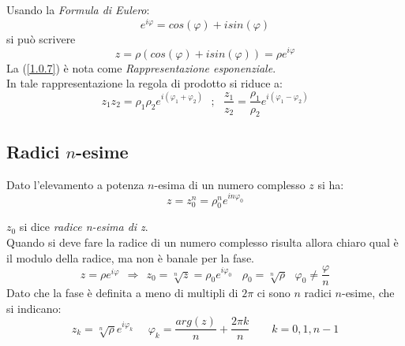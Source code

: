 \documentclass[twoside]{article}
\begin{document}
\\
\\
Usando la \textit{Formula di Eulero}:
\begin{equation}
    e^{i\varphi}=cos(\varphi)+isin(\varphi)
\end{equation}
si può scrivere 
\begin{equation} \label{1.0.7}
    z=\rho(cos(\varphi)+isin(\varphi))=\rho e^{i\varphi}
\end{equation}
La (\ref{1.0.7}) è nota come \textit{Rappresentazione esponenziale}.
\\
In tale rappresentazione la regola di prodotto si riduce a:
\begin{equation}
    z_1z_2=\rho_1 \rho_2 e^{i(\varphi_1 + \varphi_2)} \ \ \ ; \ \ \ \frac{z_1}{z_2}=\frac{\rho_1}{\rho_2}e^{i(\varphi_1 - \varphi_2)}
\end{equation}

\subsection{Radici \texorpdfstring{$n$}{Lg}-esime}
Dato l'elevamento a potenza $n$-esima di un numero complesso $z$ si ha:
\begin{equation}
    z=z_0 ^n=\rho_0 ^n e^{in\varphi_0}
\end{equation}

$z_0$ si dice \textit{radice n-esima di z}. \\
Quando si deve fare la radice di un numero complesso risulta allora chiaro qual è il modulo della radice, ma non è banale per la fase.
\begin{equation}
    z=\rho e^{i\varphi} \ \ \Rightarrow \ \ z_0=\sqrt[n]{z}=\rho_0 e^{i\varphi_0} \ \ \ \ \rho_0=\sqrt[n]{\rho} \ \ \ \varphi_0 \ne \frac{\varphi}{n}
\end{equation}
Dato che la fase è definita a meno di multipli di $2\pi$ ci sono $n$ radici $n$-esime, che si indicano:
\begin{equation}
    z_k=\sqrt[n]{\rho}e^{i\varphi_k} \ \ \ \ \ \ \varphi_k=\frac{arg(z)}{n}+\frac{2\pi k}{n} \qquad k=0,1,n-1
\end{equation}
\end{document}
